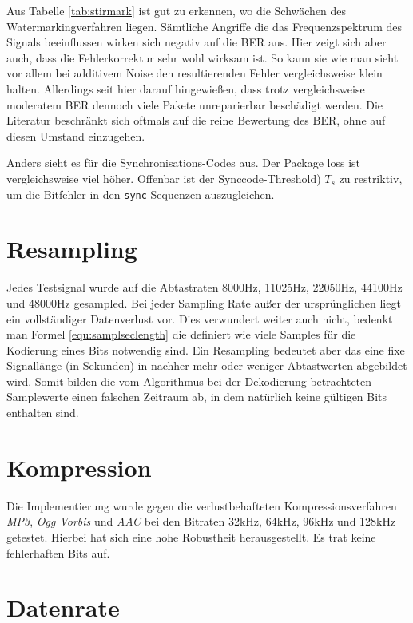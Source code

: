 Aus Tabelle \ref{tab:stirmark} ist gut zu erkennen, wo die Schwächen des Watermarkingverfahren liegen. Sämtliche Angriffe die das Frequenzspektrum des Signals beeinflussen wirken sich negativ auf die BER aus. Hier zeigt sich aber auch, dass die Fehlerkorrektur sehr wohl wirksam ist. So kann sie wie man sieht vor allem bei additivem Noise den resultierenden Fehler vergleichsweise klein halten. 
Allerdings seit hier darauf hingewießen, dass trotz vergleichsweise moderatem BER dennoch viele Pakete unreparierbar beschädigt werden. Die Literatur beschränkt sich oftmals auf die reine Bewertung des BER, ohne auf diesen Umstand einzugehen. 

Anders sieht es für die Synchronisations-Codes aus. Der Package loss ist vergleichsweise viel höher. Offenbar ist der Synccode-Threshold) ${T}_{s}$ zu restriktiv, um die Bitfehler in den \texttt{sync} Sequenzen auszugleichen.

\section{Resampling}

Jedes Testsignal wurde auf die Abtastraten 8000Hz, 11025Hz, 22050Hz, 44100Hz und 48000Hz gesampled. Bei jeder Sampling Rate außer der ursprünglichen liegt ein vollständiger Datenverlust vor. Dies verwundert weiter auch nicht, bedenkt man Formel \ref{equ:samplseclength} die definiert wie viele Samples für die Kodierung eines Bits notwendig sind. Ein Resampling bedeutet aber das eine fixe Signallänge (in Sekunden) in nachher mehr oder weniger Abtastwerten abgebildet wird. Somit bilden die vom Algorithmus bei der Dekodierung betrachteten Samplewerte einen falschen Zeitraum ab, in dem natürlich keine gültigen Bits enthalten sind. 

\section{Kompression}

Die Implementierung wurde gegen die verlustbehafteten Kompressionsverfahren \textit{MP3}, \textit{Ogg Vorbis} und \textit{AAC} bei den Bitraten 32kHz, 64kHz, 96kHz und 128kHz getestet. Hierbei hat sich eine hohe Robustheit herausgestellt. Es trat keine fehlerhaften Bits auf.  

\section{Datenrate}
\label{sec:datenrate}

